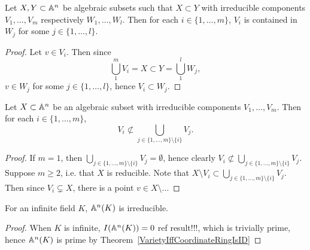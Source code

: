 \begin{proposition}\label{IrreducibleComponentsContainedInIrreducibleComponentsOfSuperset} Let $X,Y\subset \mathbb{A}^n$ be algebraic subsets such that $X\subset Y$ with irreducible components $V_1,\dots,V_m$ respectively $W_1,\dots,W_l$. Then for each $i\in\{1,\dots,m\}$, $V_i$ is contained in $W_j$ for some $j\in\{1,\dots,l\}$. 
\end{proposition}
\begin{proof}
    Let $v\in V_i$. Then since 
    $$\bigcup_1^m V_i = X \subset Y = \bigcup_1^l W_j,$$
    $v\in W_j$ for some $j\in\{1,\dots,l\}$, hence $V_i \subset W_j$.
\end{proof}
\begin{proposition}
    Let $X\subset \mathbb{A}^n$ be an algebraic subset with irreducible components $V_1,\dots,V_m$. Then for each $i\in \{1,\dots,m\}$, 
    $$V_i \not\subset \bigcup_{j\in\{1,\dots,m\}\setminus\{i\}} V_j.$$
\end{proposition}
\begin{proof}
    If $m=1$, then $\bigcup_{j\in\{1,\dots,m\}\setminus\{i\}} V_j = \emptyset$, hence clearly $V_i\not\subset \bigcup_{j\in\{1,\dots,m\}\setminus\{i\}} V_j$. Suppose $m\geq 2$, i.e. that $X$ is reducible. Note that $X\setminus V_i \subset \bigcup_{j\in\{1,\dots,m\}\setminus\{i\}} V_j$. Then since $V_i\subsetneq X$, there is a point $v\in X\setminus $...   
\end{proof}
\begin{proposition}
    For an infinite field $K$, $\mathbb{A}^n(K)$ is irreducible.
\end{proposition}
\begin{proof}
    When $K$ is infinite, $I(\mathbb{A}^n(K)) = 0$ {\LARGE ref result!!!}, which is trivially prime, hence $\mathbb{A}^n(K)$ is prime by Theorem~\ref{VarietyIffCoordinateRingIsID}
\end{proof}
